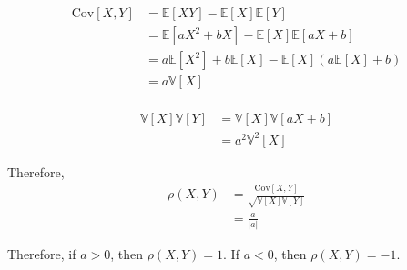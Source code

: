 \documentclass[UTF8]{article}
\begin{document}
\begin{align*}
	\text{Cov}[X, Y] &= \mathbb{E}[XY]-\mathbb{E}[X]\mathbb{E}[Y]\\
	&=\mathbb{E}[aX^2+bX] - \mathbb{E}[X]\mathbb{E}[aX+b]\\
	&=a\mathbb{E}[X^2] + b\mathbb{E}[X] - \mathbb{E}[X](a\mathbb{E}[X]+b)\\
	&= a\mathbb{V}[X]\\
\end{align*}

\begin{align*}
	\mathbb{V}[X]\mathbb{V}[Y] &= \mathbb{V}[X]\mathbb{V}[aX+b]\\
	&=a^2\mathbb{V}^2[X]
\end{align*}

Therefore, 
\begin{align*}
\rho(X, Y)&=\frac{	\text{Cov}[X, Y]}{\sqrt{\mathbb{V}[X]\mathbb{V}[Y]}}\\
&=\frac{a}{|a|}
\end{align*}

Therefore, if $a>0$, then $\rho(X, Y)=1$. If $a<0$, then $\rho(X, Y)=-1$.
\end{document}
